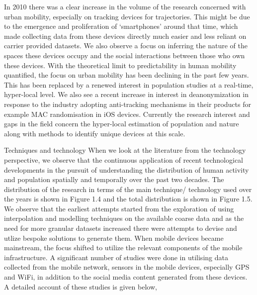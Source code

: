In 2010 there was a clear increase in the volume of the research concerned with
urban mobility, especially on tracking devices for trajectories. This might be
due to the emergence and proliferation of ‘smartphones’ around that time, which
made collecting data from these devices directly much easier and less reliant on
carrier provided datasets. We also observe a focus on inferring the nature of
the spaces these devices occupy and the social interactions between those who
own these devices. With the theoretical limit to predictability in human
mobility quantified, the focus on urban mobility has been declining in the past
few years. This has been replaced by a renewed interest in population studies at
a real-time, hyper-local level. We also see a recent increase in interest in
deanonymization in response to the industry adopting anti-tracking mechanisms in
their products for example MAC randomisation in iOS devices. Currently the
research interest and gaps in the field concern the hyper-local estimation of
population and nature along with methods to identify unique devices at this
scale.


Techniques and technology When we look at the literature from the technology
perspective, we observe that the continuous application of recent technological
developments in the pursuit of understanding the distribution of human activity
and population spatially and temporally over the past two decades. The
distribution of the research in terms of the main technique/ technology used
over the years is shown in Figure 1.4 and the total distribution is shown in
Figure 1.5. We observe that the earliest attempts started from the exploration
of using interpolation and modelling techniques on the available coarse data and
as the need for more granular datasets increased there were attempts to devise
and utlize bespoke solutions to generate them. When mobile devices became
mainstream, the focus shifted to utilize the relevant components of the mobile
infrastructure. A significant number of studies were done in utilising data
collected from the mobile network, sensors in the mobile devices, especially GPS
and WiFi, in addition to the social media content generated from these devices.
A detailed account of these studies is given below,


